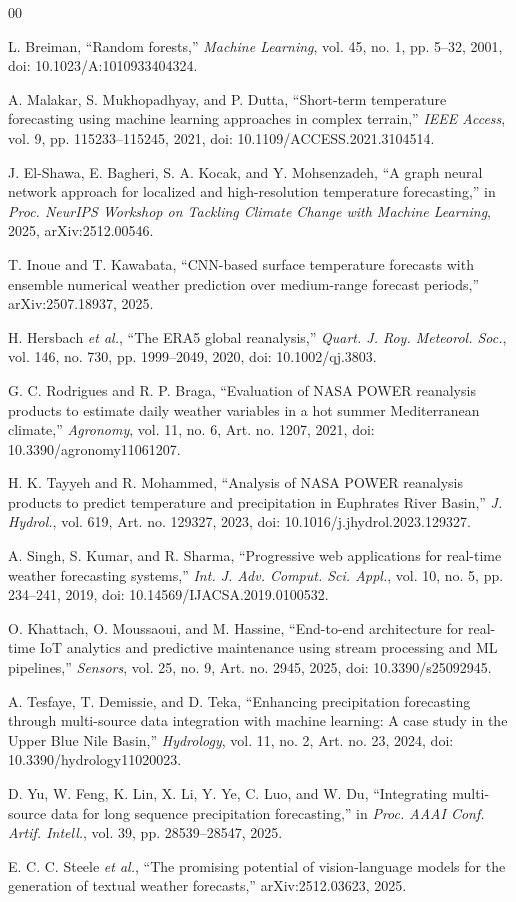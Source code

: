 \documentclass[conference]{IEEEtran}
\begin{document}
\begin{thebibliography}{00}

L. Breiman, “Random forests,” \emph{Machine Learning}, vol. 45, no. 1, pp. 5--32, 2001, doi: 10.1023/A:1010933404324.

A. Malakar, S. Mukhopadhyay, and P. Dutta, “Short-term temperature forecasting using machine learning approaches in complex terrain,” \emph{IEEE Access}, vol. 9, pp. 115233--115245, 2021, doi: 10.1109/ACCESS.2021.3104514.

J. El-Shawa, E. Bagheri, S. A. Kocak, and Y. Mohsenzadeh, “A graph neural network approach for localized and high-resolution temperature forecasting,” in \emph{Proc. NeurIPS Workshop on Tackling Climate Change with Machine Learning}, 2025, arXiv:2512.00546.

T. Inoue and T. Kawabata, “CNN-based surface temperature forecasts with ensemble numerical weather prediction over medium-range forecast periods,” arXiv:2507.18937, 2025.

H. Hersbach \emph{et al.}, “The ERA5 global reanalysis,” \emph{Quart. J. Roy. Meteorol. Soc.}, vol. 146, no. 730, pp. 1999--2049, 2020, doi: 10.1002/qj.3803.

G. C. Rodrigues and R. P. Braga, “Evaluation of NASA POWER reanalysis products to estimate daily weather variables in a hot summer Mediterranean climate,” \emph{Agronomy}, vol. 11, no. 6, Art. no. 1207, 2021, doi: 10.3390/agronomy11061207.

H. K. Tayyeh and R. Mohammed, “Analysis of NASA POWER reanalysis products to predict temperature and precipitation in Euphrates River Basin,” \emph{J. Hydrol.}, vol. 619, Art. no. 129327, 2023, doi: 10.1016/j.jhydrol.2023.129327.

A. Singh, S. Kumar, and R. Sharma, “Progressive web applications for real-time weather forecasting systems,” \emph{Int. J. Adv. Comput. Sci. Appl.}, vol. 10, no. 5, pp. 234--241, 2019, doi: 10.14569/IJACSA.2019.0100532.

O. Khattach, O. Moussaoui, and M. Hassine, “End-to-end architecture for real-time IoT analytics and predictive maintenance using stream processing and ML pipelines,” \emph{Sensors}, vol. 25, no. 9, Art. no. 2945, 2025, doi: 10.3390/s25092945.

A. Tesfaye, T. Demissie, and D. Teka, “Enhancing precipitation forecasting through multi-source data integration with machine learning: A case study in the Upper Blue Nile Basin,” \emph{Hydrology}, vol. 11, no. 2, Art. no. 23, 2024, doi: 10.3390/hydrology11020023.

D. Yu, W. Feng, K. Lin, X. Li, Y. Ye, C. Luo, and W. Du, “Integrating multi-source data for long sequence precipitation forecasting,” in \emph{Proc. AAAI Conf. Artif. Intell.}, vol. 39, pp. 28539--28547, 2025.

E. C. C. Steele \emph{et al.}, “The promising potential of vision-language models for the generation of textual weather forecasts,” arXiv:2512.03623, 2025.

\end{thebibliography}
\end{document}

